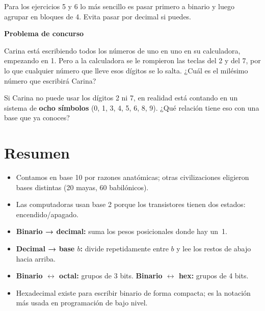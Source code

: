 \documentclass[12pt, oneside]{article}
\begin{document}
\begin{advertencia}
  Para los ejercicios 5 y 6 lo más sencillo es pasar primero a binario y
  luego agrupar en bloques de 4. Evita pasar por decimal si puedes.
\end{advertencia}

\vspace{1em}
\noindent\textbf{Problema de concurso}

Carina está escribiendo todos los números de uno en uno en su calculadora,
empezando en 1. Pero a la calculadora se le rompieron las teclas del 2 y del 7,
por lo que cualquier número que lleve esos dígitos se lo salta.
¿Cuál es el milésimo número que escribirá Carina?

\begin{consejo}[Pista]
  Si Carina no puede usar los dígitos 2 ni 7, en realidad está contando en
  un sistema de \textbf{ocho símbolos} (0, 1, 3, 4, 5, 6, 8, 9).
  ¿Qué relación tiene eso con una base que ya conoces?
\end{consejo}

\section{Resumen}

\begin{recuerda}
\begin{itemize}
  \item Contamos en base 10 por razones anatómicas; otras civilizaciones
        eligieron bases distintas (20 mayas, 60 babilónicos).
  \item Las computadoras usan base 2 porque los transistores tienen
        dos estados: encendido/apagado.
  \item \textbf{Binario → decimal:} suma los pesos posicionales donde hay un~1.
  \item \textbf{Decimal → base $b$:} divide repetidamente entre $b$
        y lee los restos de abajo hacia arriba.
  \item \textbf{Binario $\leftrightarrow$ octal:} grupos de 3 bits. \quad
        \textbf{Binario $\leftrightarrow$ hex:} grupos de 4 bits.
  \item Hexadecimal existe para escribir binario de forma compacta;
        es la notación más usada en programación de bajo nivel.
\end{itemize}
\end{recuerda}
\end{document}
